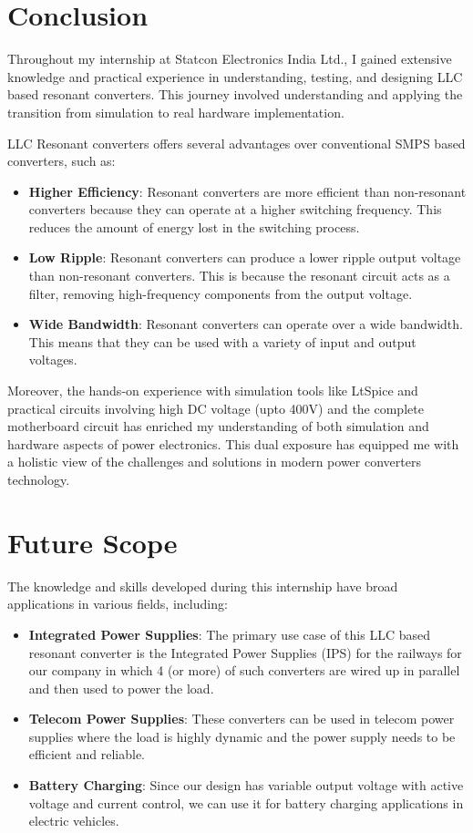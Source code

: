\section{Conclusion}
Throughout my internship at Statcon Electronics India Ltd., I gained extensive
knowledge and practical experience in understanding, testing, and designing
LLC based resonant converters. This journey involved understanding and applying
the transition from simulation to real hardware implementation.

\noindent
LLC Resonant converters offers several advantages over conventional SMPS based
converters, such as:
\begin{itemize}
    \item \textbf{Higher Efficiency}: Resonant converters are more efficient than non-resonant converters because they can operate at a higher switching frequency. This reduces the amount of energy lost in the switching process.
    \item \textbf{Low Ripple}: Resonant converters can produce a lower ripple output voltage than non-resonant converters. This is because the resonant circuit acts as a filter, removing high-frequency components from the output voltage.
    \item \textbf{Wide Bandwidth}: Resonant converters can operate over a wide bandwidth. This means that they can be used with a variety of input and output voltages.
\end{itemize}

\noindent
Moreover, the hands-on experience with simulation tools like LtSpice
and practical circuits involving high DC voltage (upto 400V) and the complete
motherboard circuit has enriched my understanding of both simulation and
hardware aspects of power electronics. This dual exposure has equipped
me with a holistic view of the challenges and solutions in modern power
converters technology.

\section{Future Scope}
The knowledge and skills developed during this internship have broad
applications in various fields, including:

\begin{itemize}
    \item \textbf{Integrated Power Supplies}: The primary use case of this LLC based resonant converter is the Integrated Power Supplies (IPS) for the railways for our company in which 4 (or more) of such converters are wired up in parallel and then used to power the load.
    \item \textbf{Telecom Power Supplies}: These converters can be used in telecom power supplies where the load is highly dynamic and the power supply needs to be efficient and reliable.
    \item \textbf{Battery Charging}: Since our design has variable output voltage with active voltage and current control, we can use it for battery charging applications in electric vehicles.
\end{itemize}

